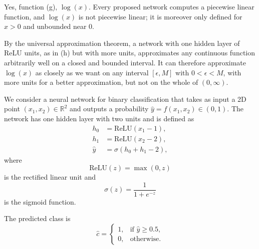 \documentclass[11pt, a4paper]{exam}
\newcommand{\ReLU}{\mathrm{ReLU}}
\begin{document}
\begin{exercises}
\begin{parts}
    \begin{solution}
        Yes, function (g), $\log(x)$. Every proposed network computes a piecewise linear function, and $\log(x)$ is not piecewise linear; it is moreover only defined for $x > 0$ and unbounded near $0$.

        By the universal approximation theorem, a network with one hidden layer of ReLU units, as in (h) but with more units, approximates any continuous function arbitrarily well on a closed and bounded interval. It can therefore approximate $\log(x)$ as closely as we want on any interval $[\epsilon, M]$ with $0 < \epsilon < M$, with more units for a better approximation, but not on the whole of $(0, \infty)$.
    \end{solution}
\end{parts}


We consider a neural network for binary classification that takes as input a 2D point $(x_1,x_2)\in\mathbb{R}^2$ and outputs a probability $\hat{y}=f(x_1,x_2)\in(0,1)$. The network has one hidden layer with two units and is defined as
\begin{align*}
    h_0 &= \ReLU(x_1-1), \\
    h_1 &= \ReLU(x_2-2), \\
    \hat{y} &= \sigma(h_0+h_1-2),
\end{align*}
where
\[
    \ReLU(z)=\max(0,z)
\]
is the rectified linear unit and
\[
    \sigma(z)=\frac{1}{1+e^{-z}}
\]
is the sigmoid function.

The predicted class is
\[
    \hat{c}=
    \begin{cases}
        1, & \text{if } \hat{y}\geq 0.5, \\
        0, & \text{otherwise}.
    \end{cases}
\]

\end{exercises}
\end{document}
